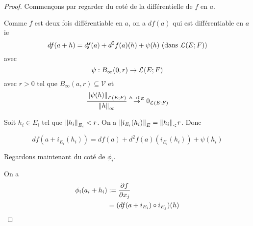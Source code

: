 \begin{proof}
	Commençons par regarder du coté de la différentielle de $f$ en $a$.

	Comme $f$ est deux fois différentiable en $a$, on a $df(a)$ qui est
	différentiable en $a$ ie
	\begin{equation}
		df(a + h) = df(a) + d^{2} f(a) (h) + \psi(h) \text{ (dans
			$\mathcal{L}_{}(E; F)$)}
	\end{equation}
	avec
	\begin{equation}
		\psi : B_{\infty}(0, r) \rightarrow \mathcal{L}_{}(E; F)
	\end{equation}
	avec $r > 0$ tel que $B_{\infty}(a, r) \subseteq \mathcal{V}$ et
	\begin{equation}
		\frac{\norm{\psi(h)}_{\mathcal{L}_{}(E; F)}}{\norm{h}_{\infty}}
		\stackrel{h \rightarrow 0_{E}}{\rightarrow} 0_{\mathcal{L}_{}(E; F)}
	\end{equation}

	Soit $h_{i} \in E_{i}$ tel que $\norm{h_{i}}_{E_{i}} < r$. On a
	$\norm{i_{E_{i}}(h_{i})}_{E} = \norm{h_{i}}_{<} r$. Donc

	\begin{equation}
		df (a + i_{E_{i}} (h_{i})) = df (a) + d^{2} f (a) (i_{E_{i}} (h_{i}))+
		\psi(h_{i})
	\end{equation}

	Regardons maintenant du coté de $\phi_{i}$.

	On a
	\begin{align}
		\phi_{i} (a_{i} + h_{i}) &:= \pdv{f}{x_{j}} (a + i_{E_{i}} (h)) \\
		& = (df (a + i_{E_{i}}) \circ i_{E_{j}}) (h)
	\end{align}

\end{proof}
\fi

